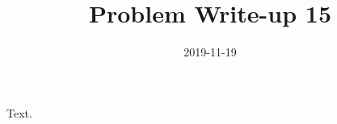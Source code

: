 \documentclass[a4paper,12pt]{article}
\title{Problem Write-up 15}
\date{2019-11-19}
\begin{document}
    Text.
\end{document}
